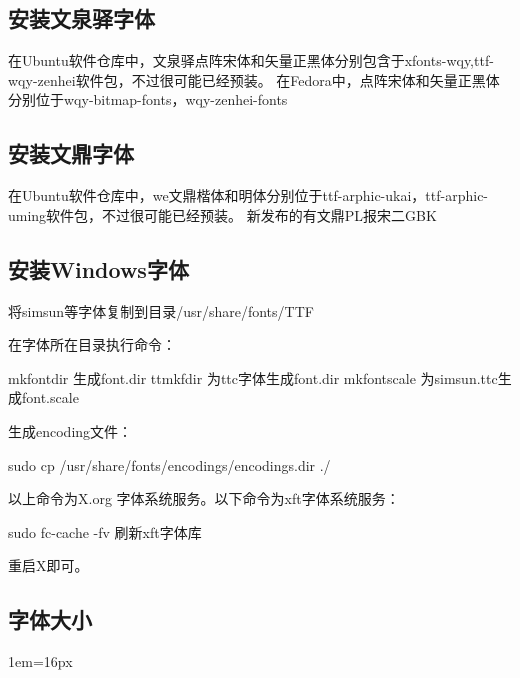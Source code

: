 \subsection{安装文泉驿字体}
在Ubuntu软件仓库中，文泉驿点阵宋体和矢量正黑体分别包含于xfonts-wqy,ttf-wqy-zenhei软件包，不过很可能已经预装。
在Fedora中，点阵宋体和矢量正黑体分别位于wqy-bitmap-fonts，wqy-zenhei-fonts

\subsection{安装文鼎字体}
在Ubuntu软件仓库中，we文鼎楷体和明体分别位于ttf-arphic-ukai，ttf-arphic-uming软件包，不过很可能已经预装。
新发布的有文鼎PL报宋二GBK

\subsection{安装Windows字体}

将simsun等字体复制到目录/usr/share/fonts/TTF

在字体所在目录执行命令：
\begin{shellcmd}
mkfontdir  生成font.dir
ttmkfdir   为ttc字体生成font.dir
mkfontscale 为simsun.ttc生成font.scale
\end{shellcmd}
生成encoding文件：
\begin{shellcmd}
sudo cp /usr/share/fonts/encodings/encodings.dir ./
\end{shellcmd}
以上命令为X.org 字体系统服务。以下命令为xft字体系统服务：
\begin{shellcmd}
sudo fc-cache -fv   刷新xft字体库
\end{shellcmd}
重启X即可。

\subsection{字体大小}
1em=16px

